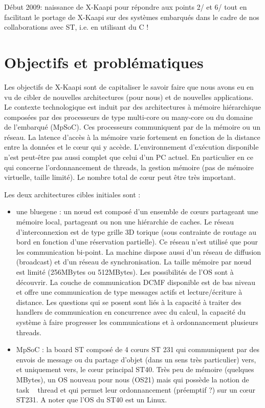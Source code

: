 \documentclass[12pt]{report}
\begin{document}
Début 2009: naissance de X-Kaapi pour répondre aux points 2/ et 6/ tout en facilitant le portage de X-Kaapi sur des systèmes embarqués dans le cadre de nos collaborations avec ST, i.e. en utilisant du C !



\newpage
\section{Objectifs et problématiques}
Les objectifs de X-Kaapi sont de capitaliser le savoir faire que nous avons eu en vu de cibler de nouvelles architectures (pour nous) et de nouvelles applications.
Le contexte technologique est induit par des architectures à mémoire hiérarchique composées par des processeurs de type multi-core ou many-core ou du domaine de l'embarqué (MpSoC). Ces processeurs communiquent par de la mémoire ou un réseau. La latence d'accès à la mémoire varie fortement en fonction de la distance entre la données et le cœur qui y accède. L'environnement d'exécution disponible n'est peut-être pas aussi complet que celui d'un PC actuel. En particulier en ce qui concerne l'ordonnancement de threads, la gestion mémoire (pas de mémoire virtuelle, taille limité). Le nombre total de cœur peut être très important.

Les deux architectures cibles initiales sont :
\begin{itemize}
\item une bluegene : un nœud est composé d'un ensemble de cœurs partageant une mémoire local, partageant ou non une hiérarchie de caches. Le réseau d'interconnexion est de type grille 3D torique (sous contrainte de routage au bord en fonction d'une réservation partielle). Ce réseau n'est utilisé que pour les communication bi-point. La machine dispose aussi d'un réseau de diffusion (broadcast) et d'un réseau de synchronisation. La taille mémoire par nœud est limité (256MBytes ou 512MBytes). Les possibilités de l'OS sont à découvrir. La couche de communication DCMF disponible est de bas niveau et offre une communication de type messages actifs et lecture/écriture à distance. Les questions qui se posent sont liés à la capacité à traiter des handlers de communication en concurrence avec du calcul, la capacité du système à faire progresser les communications et à ordonnancement plusieurs threads.
\item MpSoC : la board ST composé de 4 cœurs ST 231 qui communiquent par des envois de message ou du partage d'objet (dans un sens très particulier) vers, et uniquement vers, le cœur principal ST40. Très peu de mémoire (quelques MBytes), un OS nouveau pour nous (OS21) mais qui possède la notion de task ~ thread et qui permet leur ordonnancement (préemptif ?) sur un cœur ST231. A noter que l'OS du ST40 est un Linux.
\end{itemize}
\end{document}

